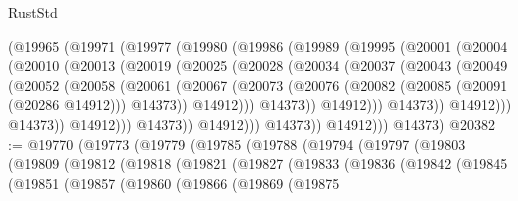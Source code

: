 \begin{lexlean}{RustStd}
\begin{coremodule}
                (@19965
                  (@19971
                    (@19977
                      (@19980
                        (@19986
                          (@19989
                            (@19995
                              (@20001
                                (@20004
                                  (@20010
                                    (@20013
                                      (@20019
                                        (@20025
                                          (@20028
                                            (@20034
                                              (@20037
                                                (@20043
                                                  (@20049
                                                    (@20052
                                                      (@20058
                                                        (@20061
                                                          (@20067
                                                            (@20073
                                                              (@20076
                                                                (@20082
                                                                  (@20085 (@20091 (@20286 @14912)))
                                                                  @14373))
                                                              @14912)))
                                                        @14373))
                                                    @14912)))
                                              @14373))
                                          @14912)))
                                    @14373))
                                @14912)))
                          @14373))
                      @14912)))
                @14373))
            @14912)))
      @14373)
@20382 := @19770
    (@19773
      (@19779
        (@19785
          (@19788
            (@19794
              (@19797
                (@19803
                  (@19809
                    (@19812
                      (@19818
                        (@19821
                          (@19827
                            (@19833
                              (@19836
                                (@19842
                                  (@19845
                                    (@19851
                                      (@19857
                                        (@19860
                                          (@19866
                                            (@19869
                                              (@19875

\end{coremodule}
\end{lexlean}
